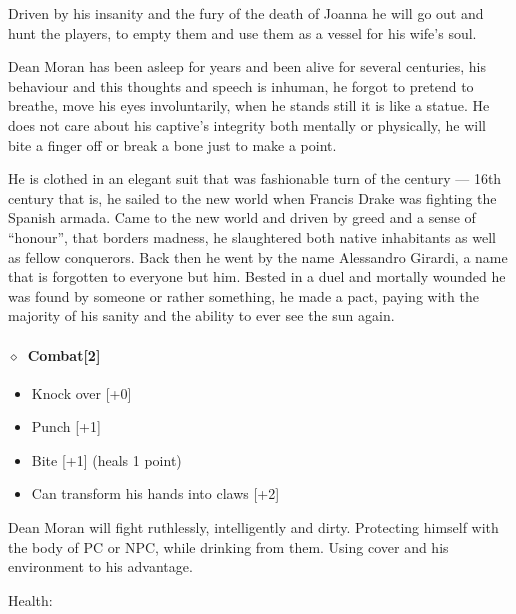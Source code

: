 Driven by his insanity and the fury of the death of Joanna he will go out and hunt the players, to empty them and use them as a
vessel for his wife's soul.

Dean Moran has been asleep for years and been alive for several centuries, his behaviour and this thoughts and speech is
inhuman, he forgot to pretend to breathe, move his eyes involuntarily, when he stands still it is like a statue.  He does not
care about his captive's integrity both mentally or physically, he will bite a finger off or break a bone just to make a point.

He is clothed in an elegant suit that was fashionable turn of the century --- 16th century that is, he sailed to the new world
when Francis Drake was fighting the Spanish armada.  Came to the new world and  driven by greed and a sense of “honour”, that
borders madness, he slaughtered both native inhabitants as well as fellow conquerors.  Back then he went by the name Alessandro
Girardi, a name that is forgotten to everyone but him.  Bested in a duel and mortally wounded he was found by someone or rather
something, he made a pact, paying with the majority of his sanity and the ability to ever see the sun again.

\paragraph{\(\diamond\)~Combat[2]}%
\begin{itemize}[noitemsep]
  \item Knock over [+0]
  \item Punch [+1]
  \item Bite [+1] (heals 1 point)
  \item Can transform his hands into claws [+2]
\end{itemize}
Dean Moran will fight ruthlessly, intelligently and dirty.
Protecting himself with the body of PC or NPC, while drinking from them.
Using cover and his environment to his advantage.
\KULTrule%

Health:    
   

